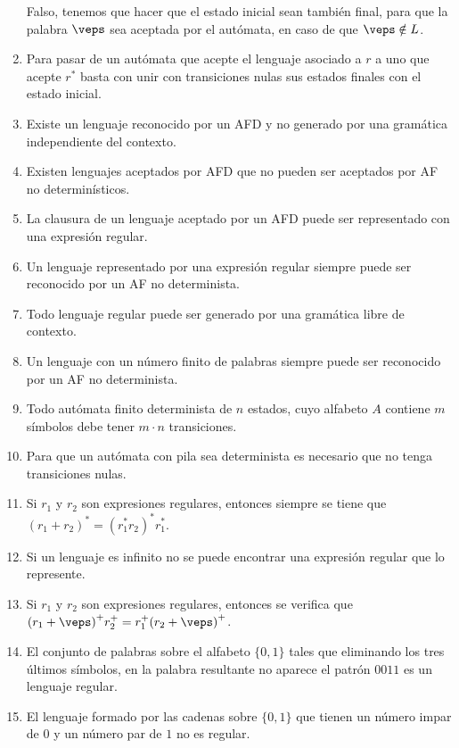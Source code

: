 \begin{enumerate}
        Falso, tenemos que hacer que el estado inicial sean también final, para que la palabra $\veps$ sea aceptada por el autómata, en caso de que $\veps \notin L$.
    \item Para pasar de un autómata que acepte el lenguaje asociado a $r$ a uno que acepte $r^\ast$ basta con unir con transiciones nulas sus estados finales con el estado inicial.
    \item Existe un lenguaje reconocido por un AFD y no generado por una gramática independiente del contexto.
    \item Existen lenguajes aceptados por AFD que no pueden ser aceptados por AF no determinísticos.
    \item La clausura de un lenguaje aceptado por un AFD puede ser representado con una expresión regular.
    \item Un lenguaje representado por una expresión regular siempre puede ser reconocido por un AF no determinista.
    \item Todo lenguaje regular puede ser generado por una gramática libre de contexto.
    \item Un lenguaje con un número finito de palabras siempre puede ser reconocido por un AF no determinista.
    \item Todo autómata finito determinista de $n$ estados, cuyo alfabeto $A$ contiene $m$ símbolos debe tener $m\cdot n$ transiciones.
    \item Para que un autómata con pila sea determinista es necesario que no tenga transiciones nulas.
    \item Si $r_1$ y $r_2$ son expresiones regulares, entonces siempre se tiene que ${(r_1+r_2)}^{\ast}={(r_1^\ast r_2)}^{\ast}r_1^\ast$.
    \item Si un lenguaje es infinito no se puede encontrar una expresión regular que lo represente.
    \item Si $r_1$ y $r_2$ son expresiones regulares, entonces se verifica que ${(r_1+\veps)}^{+}r_2^+ = r_1^+ {(r_2+\veps)}^{+}$.
    \item El conjunto de palabras sobre el alfabeto $\{0,1\}$ tales que eliminando los tres últimos símbolos, en la palabra resultante no aparece el patrón $0011$ es un lenguaje regular.
    \item El lenguaje formado por las cadenas sobre $\{0,1\}$ que tienen un número impar de $0$ y un número par de $1$ no es regular.
\end{enumerate}
